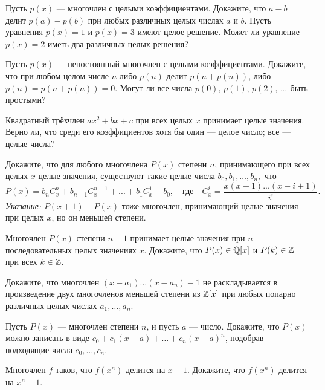 \documentclass[a4paper,12pt]{article}
\begin{document}

 Пусть $p(x)$ --- многочлен с целыми коэффициентами.
 Докажите, что $a-b$ делит $p(a)-p(b)$  при любых различных
целых числах $a$ и $b$.
 Пусть уравнения $p(x)=1$ и $p(x)=3$ имеют целое решение.
Может ли уравнение $p(x)=2$ иметь два различных целых решения?

Пусть $p(x)$ --- непостоянный многочлен с целыми коэффициентами.
 Докажите, что при любом целом числе $n$ либо
$p(n)$ делит $p(n+p(n))$, либо $p(n)=p(n+p(n))=0$.
 Могут ли все числа $p(0)$, $p(1)$, $p(2)$, \dots\  быть простыми?

Квадратный трёхчлен $ax^2 + bx + c$ при всех целых $x$ принимает целые значения. Верно ли, что среди его коэффициентов
 хотя бы один --- целое число;
 все --- целые числа?

 Докажите, что для любого многочлена $P(x)$ степени $n$, принимающего при всех целых $x$ целые значения,
существуют такие целые числа $b_0, b_1, \ldots, b_n,$  что
$$
P(x) = b_n C_x^n + b_{n-1} C_x^{n-1} + ... + b_1 C_x^1 + b_0,\quad
\text{где} \quad C_x^i = \frac{x(x-1) ... (x-i+1)}{i!}.
$$
\noindent
{\small {\em Указание:} $P(x+1)-P(x)$ тоже многочлен, принимающий целые значения при целых $x$, но он меньшей степени.}


Многочлен $P(x)$ степени $n-1$ принимает целые значения при $n$ последовательных целых значениях $x$. Докажите, что $P(x)\in \mathbb{Q}[x]$ и
$P(k)\in\mathbb{Z}$ при всех $k\in\mathbb{Z}$.

 Докажите, что  многочлен  $(x-a_1)\dots(x-a_n)-1$
не раскладывается в произведение двух многочленов меньшей степени
из $\mathbb{Z}[x]$ %
при любых попарно различных целых числах
$a_1,\dots,a_n.$



Пусть $P(x)$ --- многочлен степени $n$, и пусть $a$ --- число. Докажите, что $P(x)$ можно записать в виде $c_0+c_1(x-a)+\ldots+c_n(x-a)^n$, подобрав подходящие числа $c_0,\ldots,c_n$.

Многочлен $f$ таков, что $f(x^n)$ делится на $x-1$.
Докажите, что $f(x^n)$ делится на $x^n-1$.

\end{document}
